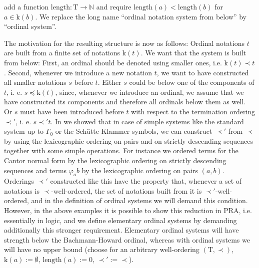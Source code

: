 \documentclass[10pt]{article}
\def\ar{\rightarrow}
\def\nat{\mathbb{N}}
\def\length{\mathrm{length}}
\def\k{\mathrm{k}}
\def\T{\mathrm{T}}
\def\PRA{\mathrm{PRA}}
\begin{document}
add a function $\length: \T \ar \nat$ and require
$\length(a) < \length(b)$ for $a \in \k(b)$. We replace the long
name ``ordinal notation system from below'' by ``ordinal system''.\par 
The motivation for the resulting structure is now as follows: Ordinal notations
$t$ are built from a finite set of notations $\k(t)$. We want
that the system is built from below: First,
an ordinal should be
denoted using smaller ones, i.e. $\k(t) \prec t$. Second, whenever
we introduce a new notation $t$, we want to have constructed all smaller 
notations $s$ before  $t$. Either $s$ could
be below one of the components of $t$, i. e. $s \preceq \k(t)$, since, whenever
we introduce an ordinal, we assume that we have constructed its
components and therefore all  ordinals below them as well. 
Or $s$ must have been introduced before $t$ with respect to the
termination ordering $\prec'$, 
i. e. $s \prec ' t$.  In \cite{setzvenedig} we showed 
that in case of simple systems like
the standard system up to $\Gamma_0$ or the Sch{\"u}tte Klammer symbols,
we can construct $\prec'$ from $\prec$ by using the lexicographic ordering on 
pairs and on strictly descending sequences together with some simple operations.
For instance we ordered terms for the Cantor normal form by
the lexicographic ordering on strictly descending sequences and terms
$\varphi_ab$ by the lexicographic ordering on pairs $(a,b)$.
Orderings $\prec'$ constructed like this have the property that, whenever a 
set of notations is $\prec$-well-ordered, the set of notations
built from it is $\prec'$-well-ordered, and in the definition
of ordinal systems we will demand this condition.
However, in the above examples it is possible to show 
this reduction in $\PRA$, i.e. essentially in logic, 
and we define elementary
ordinal systems by demanding additionally this stronger 
requirement. Elementary ordinal systems will
have strength below the Bachmann-Howard ordinal, whereas with ordinal
systems we  will have no upper bound (choose for an arbitrary
well-ordering $(\T,\prec)$, $\k(a) := \emptyset$, $\length(a):= 0$,
$\prec':= \prec$).
%
%
%
%
%
%
\end{document}
